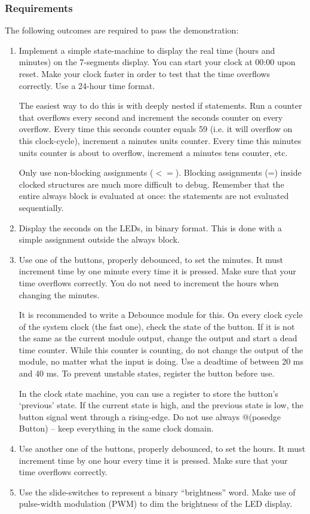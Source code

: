 \subsubsection{Requirements}
The following outcomes are required to pass the demonstration:
\begin{enumerate}
    \item Implement a simple state-machine to display the real time (hours and minutes) on the 7-segments display. You can start your clock at 00:00 upon reset. Make your clock faster in order to test that the time overflows correctly. Use a 24-hour time format. 
    
    The easiest way to do this is with deeply nested if statements. Run a counter that overflows every second and increment the seconds counter on every overflow. Every time this seconds counter equals 59 (i.e. it will overflow on this clock-cycle), increment a minutes units counter. Every time this minutes units counter is about to overflow, increment a minutes tens counter, etc. 
    
    Only use non-blocking assignments ($<=$). Blocking assignments (=) inside clocked structures are much more difficult to debug. Remember that the entire always block is evaluated at once: the statements are not evaluated sequentially.
    \item Display the seconds on the LEDs, in binary format. This is done with a simple assignment outside the always block.
    \item Use one of the buttons, properly debounced, to set the minutes. It must increment time by one minute every time it is pressed. Make sure that your time overflows correctly. You do not need to increment the hours when changing the minutes. 
    
    It is recommended to write a Debounce module for this. On every clock cycle of the system clock (the fast one), check the state of the button. If it is not the same as the current module output, change the output and start a dead time counter. While this counter is counting, do not change the output of the module, no matter what the input is doing. Use a deadtime of between 20 ms and 40 ms. To prevent unstable states, register the button before use. 
    
    In the clock state machine, you can use a register to store the button's `previous' state. If the current state is high, and the previous state is low, the button signal went through a rising-edge. Do not use always @(posedge Button) – keep everything in the same clock domain.
    \item Use another one of the buttons, properly debounced, to set the hours. It must increment time by one hour every time it is pressed. Make sure that your time overflows correctly.
    \item Use the slide-switches to represent a binary “brightness” word. Make use of pulse-width modulation (PWM) to dim the brightness of the LED display. 
    

\end{enumerate}
